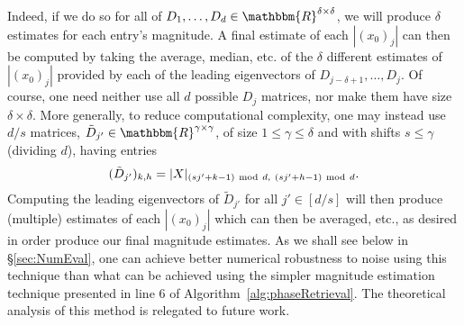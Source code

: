 Indeed, if we do so for all of $D_1, \dots, D_d \in \mathbbm{R}^{\delta \times \delta}$, we will produce $\delta$ estimates for each entry's magnitude.  A final estimate of each $|(x_0)_j|$ can then be computed by taking the average, median, etc. of the $\delta$ different estimates of $|(x_0)_j|$ provided by each of the leading eigenvectors of $D_{j-\delta+1}, \dots, D_j$.  Of course, one need neither use all $d$ possible $D_j$ matrices, nor make them have size $\delta \times \delta$.  More generally, to reduce computational complexity, one may instead use $d/s$ matrices, $\tilde{D}_{j'} \in \mathbbm{R}^{\gamma \times \gamma}$, of size $1 \leq \gamma \leq \delta$ and with shifts $s \leq \gamma$ (dividing $d$), having entries
$$(\tilde{D}_{j'})_{k,h} = |X|_{(sj'+k-1)~{\rm mod}~d,~(sj'+h-1)~{\rm mod}~d}.$$
Computing the leading eigenvectors of $\tilde{D}_{j'}$ for all $j' \in [d/s]$ will then produce (multiple) estimates of each $|(x_0)_j|$ which can then be averaged, etc., as desired in order produce our final magnitude estimates.  As we shall see below in \S \ref{sec:NumEval}, one can achieve better numerical robustness to noise using this technique than what can be achieved using the simpler magnitude estimation technique presented in line 6 of Algorithm~\ref{alg:phaseRetrieval}.  The theoretical analysis of this method is relegated to future work. 

